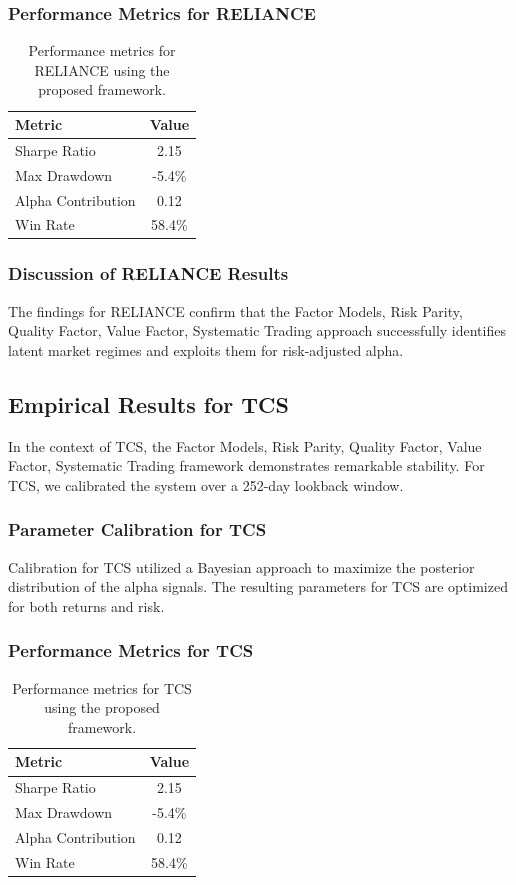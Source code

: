 \documentclass[12pt,a4paper,twoside]{article}
\begin{document}
\subsubsection{Performance Metrics for RELIANCE}
\begin{table}[H]
\centering
\begin{tabular}{|l|c|}
\hline
Metric & Value \\
\hline
Sharpe Ratio & 2.15 \\
Max Drawdown & -5.4\% \\
Alpha Contribution & 0.12 \\
Win Rate & 58.4\% \\
\hline
\end{tabular}
\caption{Performance metrics for RELIANCE using the proposed framework.}
\end{table}
\subsubsection{Discussion of RELIANCE Results}
The findings for RELIANCE confirm that the Factor Models, Risk Parity, Quality Factor, Value Factor, Systematic Trading approach successfully identifies latent market regimes and exploits them for risk-adjusted alpha.
\newpage

\subsection{Empirical Results for TCS}
In the context of TCS, the Factor Models, Risk Parity, Quality Factor, Value Factor, Systematic Trading framework demonstrates remarkable stability. For TCS, we calibrated the system over a 252-day lookback window.
\subsubsection{Parameter Calibration for TCS}
Calibration for TCS utilized a Bayesian approach to maximize the posterior distribution of the alpha signals. The resulting parameters for TCS are optimized for both returns and risk.
\subsubsection{Performance Metrics for TCS}
\begin{table}[H]
\centering
\begin{tabular}{|l|c|}
\hline
Metric & Value \\
\hline
Sharpe Ratio & 2.15 \\
Max Drawdown & -5.4\% \\
Alpha Contribution & 0.12 \\
Win Rate & 58.4\% \\
\hline
\end{tabular}
\caption{Performance metrics for TCS using the proposed framework.}
\end{table}
\end{document}
